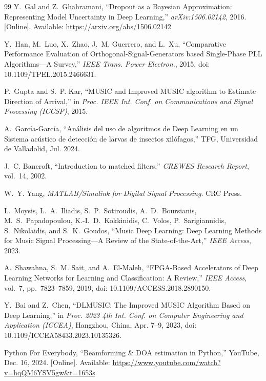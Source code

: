 \begin{thebibliography}{99}
	Y.~Gal and Z.~Ghahramani, ``Dropout as a Bayesian Approximation: Representing Model Uncertainty in Deep Learning,''
	\emph{arXiv:1506.02142}, 2016. [Online]. Available: \url{https://arxiv.org/abs/1506.02142}
	
	Y.~Han, M.~Luo, X.~Zhao, J.~M. Guerrero, and L.~Xu, 
	``Comparative Performance Evaluation of Orthogonal-Signal-Generators based Single-Phase PLL Algorithms—A Survey,''
	\emph{IEEE Trans. Power Electron.}, 2015, doi: 10.1109/TPEL.2015.2466631.
	
	P.~Gupta and S.~P. Kar, ``MUSIC and Improved MUSIC algorithm to Estimate Direction of Arrival,''
	in \emph{Proc. IEEE Int. Conf. on Communications and Signal Processing (ICCSP)}, 2015.
	
	A.~García-García, ``Análisis del uso de algoritmos de Deep Learning en un Sistema acústico de detección de larvas de insectos xilófagos,''
	TFG, Universidad de Valladolid, Jul. 2024.
	
	J.~C. Bancroft, ``Introduction to matched filters,'' 
	\emph{CREWES Research Report}, vol.~14, 2002.
	
	W.~Y. Yang, \emph{MATLAB/Simulink for Digital Signal Processing}. CRC Press.
	
	L.~Moysis, L.~A.~Iliadis, S.~P.~Sotiroudis, A.~D.~Boursianis, M.~S.~Papadopoulou, 
	K.-I.~D.~Kokkinidis, C.~Volos, P.~Sarigiannidis, S.~Nikolaidis, and S.~K.~Goudos,
	``Music Deep Learning: Deep Learning Methods for Music Signal Processing—A Review of the State-of-the-Art,''
	\emph{IEEE Access}, 2023.
	
	
	A.~Shawahna, S.~M. Sait, and A.~El-Maleh,
	``FPGA-Based Accelerators of Deep Learning Networks for Learning and Classification: A Review,''
	\emph{IEEE Access}, vol.~7, pp.~7823--7859, 2019, doi: 10.1109/ACCESS.2018.2890150.
	
	Y.~Bai and Z.~Chen,
	``DLMUSIC: The Improved MUSIC Algorithm Based on Deep Learning,''
	in \emph{Proc. 2023 4th Int. Conf. on Computer Engineering and Application (ICCEA)}, 
	Hangzhou, China, Apr. 7--9, 2023, 
	doi: 10.1109/ICCEA58433.2023.10135326.
	
	
	Python For Everybody, ``Beamforming \& DOA estimation in Python,'' YouTube, Dec. 16, 2024.
	[Online]. Available: \url{https://www.youtube.com/watch?v=hqQM6YSV5gw&t=1653s}
	

\end{thebibliography}
